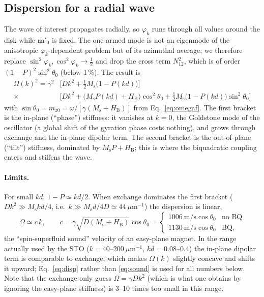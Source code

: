 \documentclass[11pt,a4paper]{article}
\newcommand{\vect}[1]{\mathbf{#1}}
\newcommand{\Ms}{M_\mathrm{s}}
\newcommand{\HB}{H_\mathrm{B}}
\begin{document}
\subsection{Dispersion for a radial wave}
The wave of interest propagates radially, so $\varphi_k$ runs through all values around the disk while
$\vect m'_0$ is fixed.  The one-armed mode is not an eigenmode of the anisotropic $\varphi_k$-dependent problem but
of its azimuthal average; we therefore replace $\sin^2\varphi_k,\cos^2\varphi_k\to\tfrac12$ and drop the cross term
$N_{12}^2$, which is of order $(1-P)^2\sin^2\theta_0$ (below 1\,\%).  The result is
\begin{equation}
\boxed{\;\begin{aligned}
\Omega(k)^2=\gamma^2&\Big[Dk^2+\tfrac12\Ms\big(1-P(kd)\big)\Big]\\
\times&\Big[Dk^2+\big(\Ms P(kd)+\HB\big)\cos^2\theta_0+\tfrac12\Ms\big(1-P(kd)\big)\sin^2\theta_0\Big]
\end{aligned}\;}
\label{eq:disp}
\end{equation}
with $\sin\theta_0=m_{z0}=\omega/[\gamma(\Ms+\HB)]$ from Eq.~\eqref{eq:omegaf}.
The first bracket is the in-plane (``phase'') stiffness: it vanishes at $k=0$, the Goldstone mode of the
oscillator (a global shift of the gyration phase costs nothing), and grows through exchange and the in-plane
dipolar term.  The second bracket is the out-of-plane (``tilt'') stiffness, dominated by $\Ms P+\HB$; this is
where the biquadratic coupling enters and stiffens the wave.

\paragraph{Limits.}
For small $kd$, $1-P\simeq kd/2$.  When exchange dominates the first bracket ($Dk^2\gg\Ms kd/4$, i.e.\
$k\gg\Ms d/4D\simeq44\ \mu\mathrm{m}^{-1}$) the dispersion is linear,
\begin{equation}
\Omega\simeq c\,k,\qquad c=\gamma\sqrt{D(\Ms+\HB)}\cos\theta_0
=\begin{cases}1006\ \mathrm{m/s}\cos\theta_0 & \text{no BQ}\\ 1130\ \mathrm{m/s}\cos\theta_0 & \text{BQ,}\end{cases}
\label{eq:sound}
\end{equation}
the ``spin-superfluid sound'' velocity of an easy-plane magnet.  In the range actually used by the STO
($k=40$--$200\ \mu\mathrm{m}^{-1}$, $kd=0.08$--$0.4$) the in-plane dipolar term is comparable to exchange, which
makes $\Omega(k)$ slightly concave and shifts it upward; Eq.~\eqref{eq:disp} rather than \eqref{eq:sound}
is used for all numbers below.  Note that the exchange-only guess $\Omega=\gamma Dk^2$ (which is what one obtains
by ignoring the easy-plane stiffness) is 3--10 times too small in this range.
\end{document}
